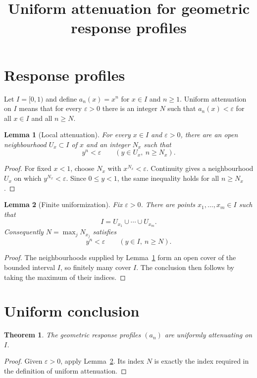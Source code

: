 \documentclass{article}
\title{Uniform attenuation for geometric response profiles}
\author{}
\date{}
\newtheorem{lemma}{Lemma}
\newtheorem{theorem}{Theorem}
\begin{document}
\maketitle

\section{Response profiles}

Let \(I=[0,1)\) and define \(a_n(x)=x^n\) for \(x\in I\) and \(n\geq1\).
Uniform attenuation on \(I\) means that for every \(\varepsilon>0\) there
is an integer \(N\) such that \(a_n(x)<\varepsilon\) for all \(x\in I\)
and all \(n\geq N\).

\begin{lemma}[Local attenuation]\label{lem:local}
For every \(x\in I\) and \(\varepsilon>0\), there are an open neighbourhood
\(U_x\subset I\) of \(x\) and an integer \(N_x\) such that
\[
 y^n<\varepsilon\qquad(y\in U_x,\ n\geq N_x).
\]
\end{lemma}

\begin{proof}
For fixed \(x<1\), choose \(N_x\) with \(x^{N_x}<\varepsilon\).
Continuity gives a neighbourhood \(U_x\) on which
\(y^{N_x}<\varepsilon\). Since \(0\leq y<1\), the same inequality holds
for all \(n\geq N_x\).
\end{proof}

\begin{lemma}[Finite uniformization]\label{lem:uniformize}
Fix \(\varepsilon>0\). There are points \(x_1,\ldots,x_m\in I\) such that
\[
 I=U_{x_1}\cup\cdots\cup U_{x_m}.
\]
Consequently \(N=\max_jN_{x_j}\) satisfies
\[
 y^n<\varepsilon\qquad(y\in I,\ n\geq N).
\]
\end{lemma}

\begin{proof}
The neighbourhoods supplied by Lemma~\ref{lem:local} form an open cover of
the bounded interval \(I\), so finitely many cover \(I\). The conclusion
then follows by taking the maximum of their indices.
\end{proof}

\section{Uniform conclusion}

\begin{theorem}\label{thm:uniform-decay}
The geometric response profiles \((a_n)\) are uniformly attenuating on \(I\).
\end{theorem}

\begin{proof}
Given \(\varepsilon>0\), apply Lemma~\ref{lem:uniformize}. Its index \(N\)
is exactly the index required in the definition of uniform attenuation.
\end{proof}
\end{document}
